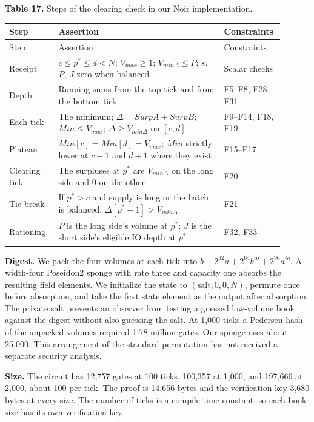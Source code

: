 \textbf{Table 17.} Steps of the clearing check in our Noir implementation.

\begingroup
\setlength{\tabcolsep}{2pt}\small
\begin{longtable}{@{}>{\raggedright\arraybackslash}p{0.1710\linewidth}>{\raggedright\arraybackslash}p{0.5760\linewidth}>{\raggedright\arraybackslash}p{0.1530\linewidth}@{}}
\toprule
Step & Assertion & Constraints \\
\midrule\endfirsthead
\toprule
Step & Assertion & Constraints \\
\midrule\endhead
\bottomrule\endfoot
Receipt & \(c \le p^* \le d < N\); \(V_{max} \ge 1\); \(V_{min\Delta} \le P\); \(s\), \(P\), \(J\) zero when balanced & Scalar checks \\
Depth & Running sums from the top tick and from the bottom tick & F5--F8, F28--F31 \\
Each tick & The minimum; \(\Delta = SurpA + SurpB\); \(Min \le V_{max}\); \(\Delta \ge V_{min\Delta}\) on \([c,d]\) & F9--F14, F18, F19 \\
Plateau & \(Min[c] = Min[d] = V_{max}\); \(Min\) strictly lower at \(c - 1\) and \(d + 1\) where they exist & F15--F17 \\
Clearing tick & The surpluses at \(p^*\) are \(V_{min\Delta}\) on the long side and 0 on the other & F20 \\
Tie-break & If \(p^* > c\) and supply is long or the batch is balanced, \(\Delta[p^* - 1] > V_{min\Delta}\) & F21 \\
Rationing & \(P\) is the long side's volume at \(p^*\); \(J\) is the short side's eligible IO depth at \(p^*\) & F32, F33 \\
\end{longtable}
\endgroup

\textbf{Digest.} We pack the four volumes at each tick into \(b+2^{32}a+2^{64}b^{io}+2^{96}a^{io}\). A width-four Poseidon2 sponge with rate three and capacity one absorbs the resulting field elements. We initialize the state to \((\text{salt},0,0,N)\), permute once before absorption, and take the first state element as the output after absorption. The private salt prevents an observer from testing a guessed low-volume book against the digest without also guessing the salt. At 1,000 ticks a Pedersen hash of the unpacked volumes required 1.78 million gates. Our sponge uses about 25,000. This arrangement of the standard permutation has not received a separate security analysis.

\textbf{Size.} The circuit has 12,757 gates at 100 ticks, 100,357 at 1,000, and 197,666 at 2,000, about 100 per tick. The proof is 14,656 bytes and the verification key 3,680 bytes at every size. The number of ticks is a compile-time constant, so each book size has its own verification key.


